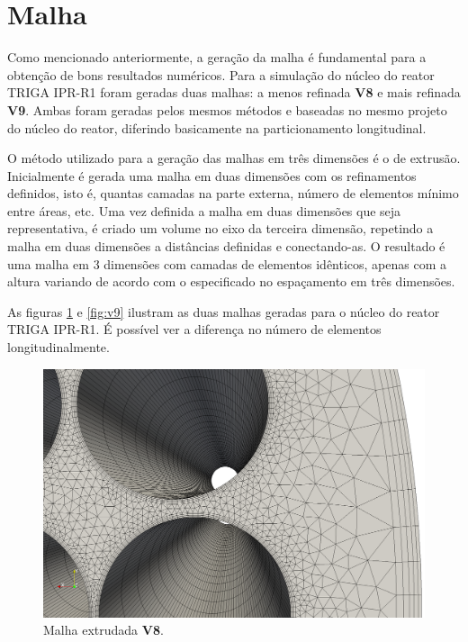 \documentclass[12pt,openright,twoside,a4paper,english,french,spanish,brazil]{abntex2}
\begin{document}
\section{Malha}
\label{sec:malha}

Como mencionado anteriormente, a geração da malha é fundamental para a obtenção de bons resultados numéricos. 
Para a simulação do núcleo do reator TRIGA IPR-R1 foram geradas duas malhas: a menos refinada \textbf{V8} e mais 
refinada \textbf{V9}. Ambas foram geradas pelos mesmos 
métodos e baseadas no mesmo projeto do núcleo do reator, diferindo basicamente na particionamento longitudinal.

O método utilizado para a geração das malhas em três dimensões é o de extrusão. Inicialmente é gerada uma malha 
em duas dimensões com os refinamentos definidos, isto é, quantas camadas na parte externa, número de elementos 
mínimo entre áreas, etc. Uma vez definida a malha em duas dimensões que seja representativa, é criado um volume 
no eixo da terceira dimensão, repetindo a malha em duas dimensões a distâncias definidas e conectando-as. O resultado 
é uma malha em 3 dimensões com camadas de elementos idênticos, apenas com a altura variando de acordo com 
o especificado no espaçamento em três dimensões.

As figuras \ref{fig:v8} e \ref{fig:v9} ilustram as duas malhas geradas para o núcleo do reator TRIGA IPR-R1. É 
possível ver a diferença no número de elementos longitudinalmente.

\begin{figure}[h]
  \centering\includegraphics[scale=0.25]{figuras/v8_2.png}
  \caption{Malha extrudada \textbf{V8}.}
  \label{fig:v8}
\end{figure}
\end{document}
